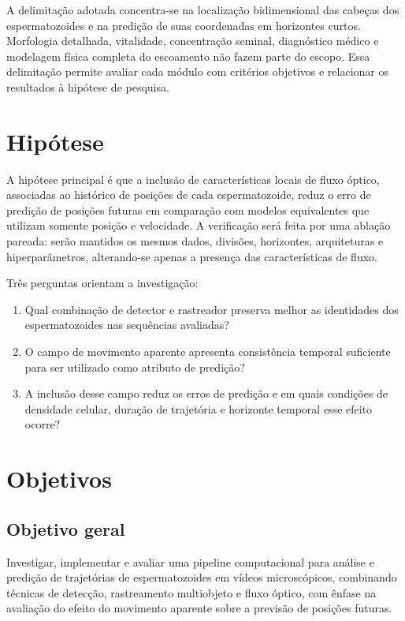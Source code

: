 A delimitação adotada concentra-se na localização bidimensional das cabeças dos espermatozoides e na predição de suas coordenadas em horizontes curtos. Morfologia detalhada, vitalidade, concentração seminal, diagnóstico médico e modelagem física completa do escoamento não fazem parte do escopo. Essa delimitação permite avaliar cada módulo com critérios objetivos e relacionar os resultados à hipótese de pesquisa.

\section{Hipótese}

A hipótese principal é que a inclusão de características locais de fluxo óptico, associadas ao histórico de posições de cada espermatozoide, reduz o erro de predição de posições futuras em comparação com modelos equivalentes que utilizam somente posição e velocidade. A verificação será feita por uma ablação pareada: serão mantidos os mesmos dados, divisões, horizontes, arquiteturas e hiperparâmetros, alterando-se apenas a presença das características de fluxo.

Três perguntas orientam a investigação:

\begin{enumerate}
	\item Qual combinação de detector e rastreador preserva melhor as identidades dos espermatozoides nas sequências avaliadas?
	\item O campo de movimento aparente apresenta consistência temporal suficiente para ser utilizado como atributo de predição?
	\item A inclusão desse campo reduz os erros de predição e em quais condições de densidade celular, duração de trajetória e horizonte temporal esse efeito ocorre?
\end{enumerate}

\section{Objetivos}

\subsection{Objetivo geral}

Investigar, implementar e avaliar uma pipeline computacional para análise e predição de trajetórias de espermatozoides em vídeos microscópicos, combinando técnicas de detecção, rastreamento multiobjeto e fluxo óptico, com ênfase na avaliação do efeito do movimento aparente sobre a previsão de posições futuras.

